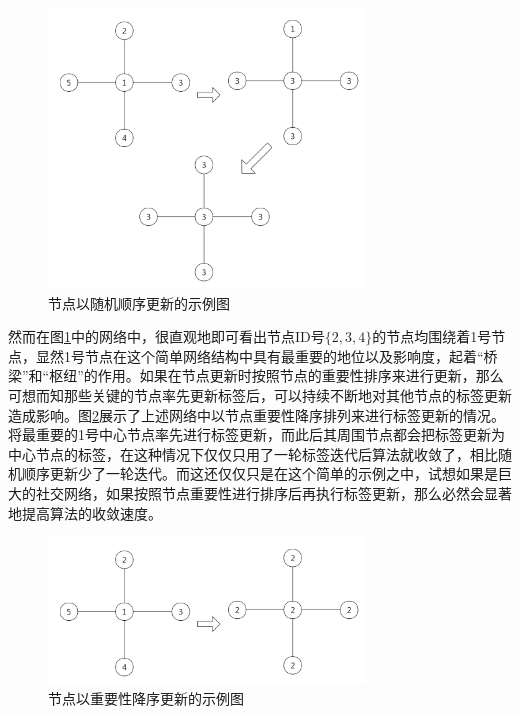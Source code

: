 \begin{figure}
  \centering
  \includegraphics[width=0.75\textwidth]{figures/jiediansuijigengxinshunxu}
  \caption{节点以随机顺序更新的示例图}\label{fig:jiediansuijigengxinshunxu}
\end{figure}

然而在图\ref{fig:jiediansuijigengxinshunxu}中的网络中，很直观地即可看出节点ID号$\{2,3,4 \} $的节点均围绕着1号节点，显然1号节点在这个简单网络结构中具有最重要的地位以及影响度，起着“桥梁”和“枢纽”的作用。如果在节点更新时按照节点的重要性排序来进行更新，那么可想而知那些关键的节点率先更新标签后，可以持续不断地对其他节点的标签更新造成影响。图\ref{fig:jiedianyingxiangzhigengxinshunxu}展示了上述网络中以节点重要性降序排列来进行标签更新的情况。将最重要的1号中心节点率先进行标签更新，而此后其周围节点都会把标签更新为中心节点的标签，在这种情况下仅仅只用了一轮标签迭代后算法就收敛了，相比随机顺序更新少了一轮迭代。而这还仅仅只是在这个简单的示例之中，试想如果是巨大的社交网络，如果按照节点重要性进行排序后再执行标签更新，那么必然会显著地提高算法的收敛速度。

\begin{figure}
  \centering
  \includegraphics[width=0.75\textwidth]{figures/jiedianyingxiangzhigengxinshunxu}
  \caption{节点以重要性降序更新的示例图}\label{fig:jiedianyingxiangzhigengxinshunxu}
\end{figure}

